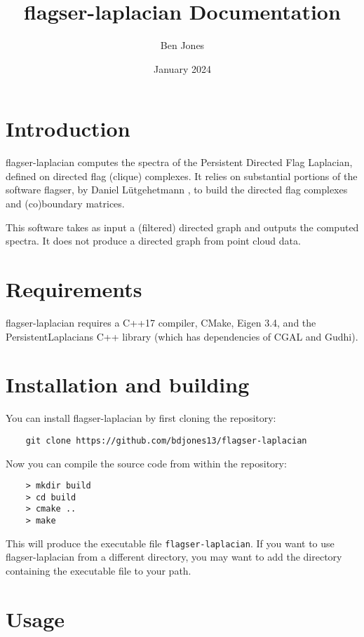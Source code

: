 \documentclass{article}
\title{flagser-laplacian Documentation}
\author{Ben Jones}
\date{January 2024}
\begin{document}
\maketitle

\section{Introduction}
flagser-laplacian computes the spectra of the Persistent Directed Flag Laplacian, defined on directed flag (clique) complexes. It relies on substantial portions of the software flagser, by Daniel L\"utgehetmann \cite{lutgehetmannComputingPersistentHomology2020}, to build the directed flag complexes and (co)boundary matrices. 

This software takes as input a (filtered) directed graph and outputs the computed spectra. It does not produce a directed graph from point cloud data.

\section{Requirements}
flagser-laplacian requires a C++17 compiler, CMake, Eigen 3.4, and the PersistentLaplacians C++ library (which has dependencies of CGAL and Gudhi).

\section{Installation and building}
You can install flagser-laplacian by first cloning the repository:

\begin{verbatim}
    git clone https://github.com/bdjones13/flagser-laplacian
\end{verbatim} 

Now you can compile the source code from within the repository: 

\begin{verbatim}
    > mkdir build
    > cd build
    > cmake ..
    > make
\end{verbatim}

This will produce the executable file \verb|flagser-laplacian|. If you want to use flagser-laplacian from a different directory, you may want to add the directory containing the executable file to your path.

\section{Usage}
\end{document}
